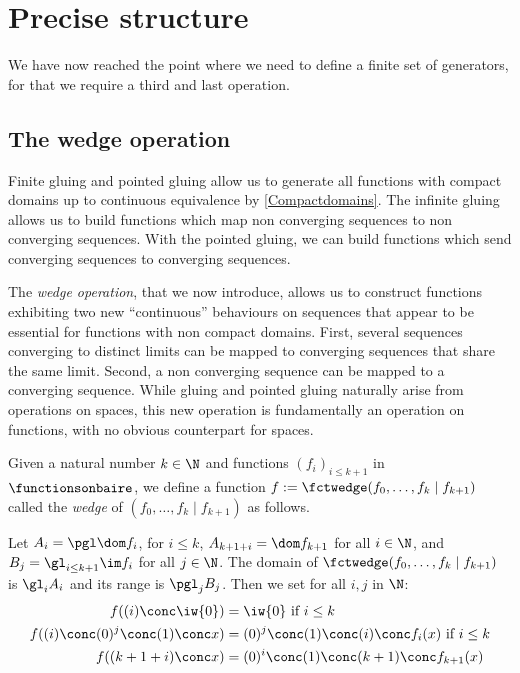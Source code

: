 
\chapter{Precise structure} \label{PreciseStructureFinal}

We have now reached the point where we need to define a finite set of generators, for that we require a third and last operation.

\section{The wedge operation}\label{subsectionWedge}


Finite gluing and pointed gluing allow us to generate all functions with compact domains up to continuous equivalence by \cref{Compactdomains}.
The infinite gluing allows us to build functions which map non converging sequences to non converging sequences.
With the pointed gluing, we can build functions which send converging sequences to converging sequences.

The \emph{wedge operation}, that we now introduce, allows us to construct functions exhibiting two new ``continuous'' behaviours on sequences that appear to be essential for functions with non compact domains.
First, several sequences converging to distinct limits can be mapped to converging sequences that share the same limit.
Second, a non converging sequence can be mapped to a converging sequence.
While gluing and pointed gluing naturally arise from operations on spaces, this new operation is fundamentally an operation on functions, with no obvious counterpart for spaces.  

\begin{definition}
Given a natural number $k\in \N$ and functions $(f_i)_{i\leq k+1}$ in $\functionsonbaire$,
we define a function $f:=\fctwedge (f_0,\ldots,f_{k}\mid f_{k+1})$ called the \emph{wedge} of $(f_0,\ldots,f_{k}\mid f_{k+1})$ as follows.

Let $A_i= \pgl \dom f_i$, for $i\leq k$, $A_{k+1+i}=\dom f_{k+1}$ for all $i\in\N$, and $B_j= \gl_{i\leq k+1}\im f_i$ for all $j\in \N$.
The domain of $\fctwedge (f_0,\ldots,f_{k}\mid f_{k+1})$ is $\gl_{i} A_i$ and its range is $\pgl_j B_j$.
Then we set for all $i,j$ in $\N$:
\begin{align*}
f ((i)\conc \iw{0})&=\iw{0}\mbox{ if }i\leq k \\
 f((i)\conc(0)^j\conc(1)\conc x)&=(0)^j\conc(1)\conc(i)\conc f_i(x)\mbox{ if }i\leq k \\
  f((k+1+i)\conc x)&=(0)^i\conc(1)\conc(k+1)\conc f_{k+1}(x)
\end{align*}
\end{definition}

